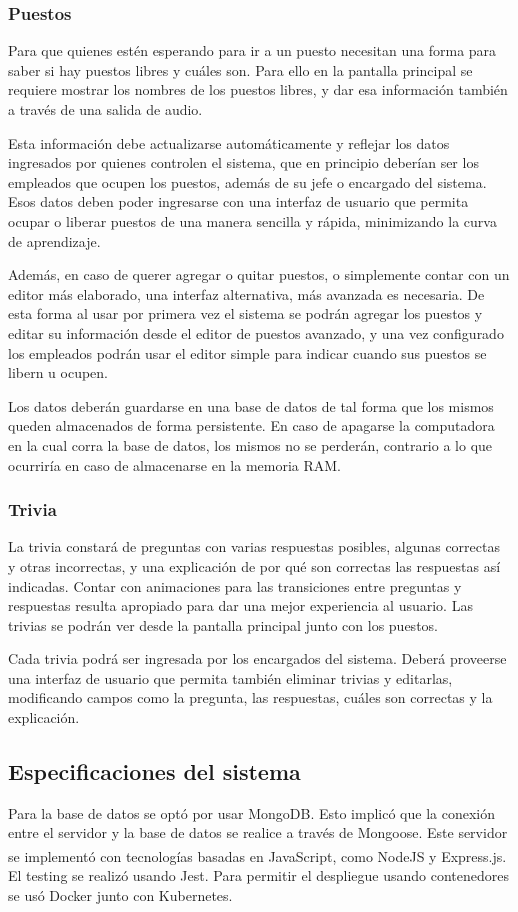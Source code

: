 \documentclass{article}
\begin{document}
\subsubsection{Puestos}
Para que quienes estén esperando para ir a un puesto necesitan una forma para saber si hay puestos libres y cuáles son. Para ello en la pantalla principal se requiere mostrar los nombres de los puestos libres, y dar esa información también a través de una salida de audio.

Esta información debe actualizarse automáticamente y reflejar los datos ingresados por quienes controlen el sistema, que en principio deberían ser los empleados que ocupen los puestos, además de su jefe o encargado del sistema. Esos datos deben poder ingresarse con una interfaz de usuario que permita ocupar o liberar puestos de una manera sencilla y rápida, minimizando la curva de aprendizaje. 

Además, en caso de querer agregar o quitar puestos, o simplemente contar con un editor más elaborado, una interfaz alternativa, más avanzada es necesaria. De esta forma al usar por primera vez el sistema se podrán agregar los puestos y editar su información desde el editor de puestos avanzado, y una vez configurado los empleados podrán usar el editor simple para indicar cuando sus puestos se libern u ocupen.

Los datos deberán guardarse en una base de datos de tal forma que los mismos queden almacenados de forma persistente. En caso de apagarse la computadora en la cual corra la  base de datos, los mismos no se perderán, contrario a lo que ocurriría en caso de almacenarse en la memoria RAM.
\subsubsection{Trivia}
La trivia constará de preguntas con varias respuestas posibles, algunas correctas y otras incorrectas, y una explicación de por qué son correctas las respuestas así indicadas. Contar con animaciones para las transiciones entre preguntas y respuestas resulta apropiado para dar una mejor experiencia al usuario. Las trivias se podrán ver desde la pantalla principal junto con los puestos.

Cada trivia podrá ser ingresada por los encargados del sistema. Deberá proveerse una interfaz de usuario que permita también eliminar trivias y editarlas, modificando campos como la pregunta, las respuestas, cuáles son correctas y la explicación.
\newpage
\subsection{Especificaciones del sistema}
Para la base de datos se optó por usar MongoDB. Esto implicó que la conexión entre el servidor y la base de datos se realice a través de Mongoose. Este servidor se implementó con tecnologías basadas en JavaScript, como NodeJS\textsuperscript{\textregistered} y Express.js. El testing se realizó usando Jest. Para permitir el despliegue usando contenedores se usó Docker junto con Kubernetes.
\end{document}
